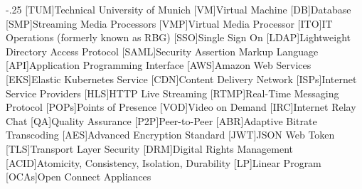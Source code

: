 \documentclass[headsepline,footsepline,footinclude=false,oneside,fontsize=11pt,paper=a4,listof=totoc,bibliography=totoc]{scrbook} %
\begin{document}


\frontmatter{}





\tableofcontents{}

\mainmatter{}






%





\appendix{}


\begin{acronym}
	\itemsep-.25\baselineskip
	[TUM]{Technical University of Munich}
 	[VM]{Virtual Machine}
 	[DB]{Database}
 	[SMP]{Streaming Media Processors}
 	[VMP]{Virtual Media Processor}
 	[ITO]{IT Operations (formerly known as RBG)}
 	[SSO]{Single Sign On}
 	[LDAP]{Lightweight Directory Access Protocol}
 	[SAML]{Security Assertion Markup Language}
 	[API]{Application Programming Interface}
 	[AWS]{Amazon Web Services}
 	[EKS]{Elastic Kubernetes Service}
 	[CDN]{Content Delivery Network}
 	[ISPs]{Internet Service Providers}
 	[HLS]{HTTP Live Streaming}
 	[RTMP]{Real-Time Messaging Protocol}
 	[POPs]{Points of Presence}
 	[VOD]{Video on Demand}
 	[IRC]{Internet Relay Chat}
 	[QA]{Quality Assurance}
 	[P2P]{Peer-to-Peer}
 	[ABR]{Adaptive Bitrate Transcoding}
 	[AES]{Advanced Encryption Standard}
 	[JWT]{JSON Web Token}
 	[TLS]{Transport Layer Security}
 	[DRM]{Digital Rights Management}
 	[ACID]{Atomicity, Consistency, Isolation, Durability}
 	[LP]{Linear Program}
 	[OCAs]{Open Connect Appliances}
\end{acronym}

\listoffigures{}
\listoftables{}
\printbibliography{}
\end{document}
